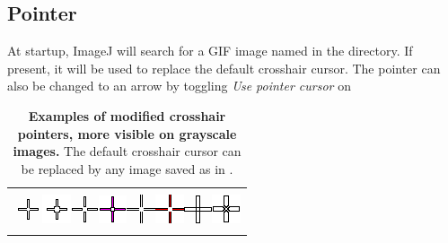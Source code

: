 

\subsection[Pointer]{Pointer\label{sub:Pointer}}

\noindent At startup, ImageJ will search for a GIF image named 
in the  directory. If present, it will
be used to replace the default crosshair cursor.
The pointer can also be changed to an arrow by toggling \emph{Use
pointer cursor} on 

\noindent 
\begin{table}
\noindent \caption[Modified pointers ]{\label{tab:CustomPointers}\textbf{Examples of modified crosshair
pointers, more visible on grayscale images. }The default crosshair
cursor can be replaced by any image saved as \protect{}
in \protect{}.}


\noindent %
\begin{tabular}{l}
\toprule 
\cellcolor{black!15}\tabularnewline\addlinespace[-8pt]
\cellcolor{black!15}\includegraphics{images/pointers/crosshair-cursor-1}\enskip{}\includegraphics{images/pointers/crosshair-cursor-2}\enskip{}\includegraphics{images/pointers/crosshair-cursor-3}\enskip{}\includegraphics{images/pointers/crosshair-cursor-4}\enskip{}\includegraphics{images/pointers/crosshair-cursor-5}\enskip{}\includegraphics{images/pointers/crosshair-cursor-6}\enskip{}\includegraphics{images/pointers/crosshair-cursor-7}\enskip{}\includegraphics{images/pointers/crosshair-cursor-8}\tabularnewline\addlinespace[1pt]
\bottomrule
\end{tabular}
\end{table}


